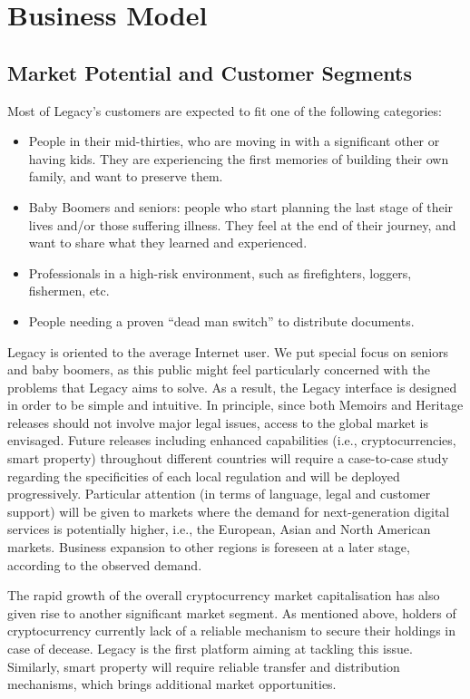 \chapter{Business Model} %
\label{cha:business_model}


\section{Market Potential and Customer Segments} %
\label{sec:markt_potential_and_customer_segments}
Most of Legacy’s customers are expected to fit one of the following categories:
\begin{itemize}
	\item People in their mid-thirties, who are moving in with a significant other or having kids. They are experiencing the first memories of building their own family, and want to preserve them.
	\item Baby Boomers and seniors: people who start planning the last stage of their lives and/or those suffering illness. They feel at the end of their journey, and want to share what they learned and experienced.
	\item Professionals in a high-risk environment, such as firefighters, loggers, fishermen, etc.
	\item People needing a proven “dead man switch” to distribute documents.
\end{itemize}

Legacy is oriented to the average Internet user. We put special focus on seniors  and baby boomers, as this public might feel particularly concerned with the problems that Legacy aims to solve. As a result, the Legacy interface is designed in order to be simple and intuitive. In principle, since both Memoirs and Heritage releases should not involve major legal issues, access to the global market is envisaged. Future releases including enhanced capabilities (i.e., cryptocurrencies, smart property) throughout different countries will require a case-to-case study regarding the specificities of each local regulation and will be deployed progressively. Particular attention (in terms of language, legal and customer support) will be given to markets where the demand for next-generation digital services is potentially higher, i.e., the European, Asian and North American markets. Business expansion to other regions is foreseen at a later stage, according to the observed demand.  

The rapid growth of the overall cryptocurrency market capitalisation has also given rise to another significant market segment. As mentioned above, holders of cryptocurrency currently lack of a reliable mechanism to secure their holdings in case of decease. Legacy is the first platform aiming at tackling this issue. Similarly, smart property will require reliable transfer and distribution mechanisms, which brings additional market opportunities. 

